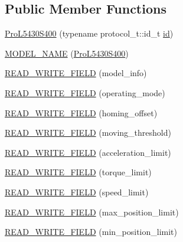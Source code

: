 \subsection*{Public Member Functions}
\begin{DoxyCompactItemize}
\item 
\hyperlink{classdynamixel_1_1servos_1_1_pro_l5430_s400_af4b0f26432d0cff1da96587695f6f37b}{Pro\+L5430\+S400} (typename protocol\+\_\+t\+::id\+\_\+t \hyperlink{classdynamixel_1_1servos_1_1_servo_a2d022081672e25a7bb57b76706e1cc57}{id})
\item 
\hyperlink{classdynamixel_1_1servos_1_1_pro_l5430_s400_ad33f5bc07548ce765acddfe12567bfa4}{M\+O\+D\+E\+L\+\_\+\+N\+A\+ME} (\hyperlink{classdynamixel_1_1servos_1_1_pro_l5430_s400}{Pro\+L5430\+S400})
\item 
\hyperlink{classdynamixel_1_1servos_1_1_pro_l5430_s400_a548d8b215279c3f45d637e178388aa8a}{R\+E\+A\+D\+\_\+\+W\+R\+I\+T\+E\+\_\+\+F\+I\+E\+LD} (model\+\_\+info)
\item 
\hyperlink{classdynamixel_1_1servos_1_1_pro_l5430_s400_a43c7426506ee4c5953f2beebd71f8877}{R\+E\+A\+D\+\_\+\+W\+R\+I\+T\+E\+\_\+\+F\+I\+E\+LD} (operating\+\_\+mode)
\item 
\hyperlink{classdynamixel_1_1servos_1_1_pro_l5430_s400_a37dcd01bb0fb5f5f68c100892dc86751}{R\+E\+A\+D\+\_\+\+W\+R\+I\+T\+E\+\_\+\+F\+I\+E\+LD} (homing\+\_\+offset)
\item 
\hyperlink{classdynamixel_1_1servos_1_1_pro_l5430_s400_a4ac72ffe983f53ee57a4778686932566}{R\+E\+A\+D\+\_\+\+W\+R\+I\+T\+E\+\_\+\+F\+I\+E\+LD} (moving\+\_\+threshold)
\item 
\hyperlink{classdynamixel_1_1servos_1_1_pro_l5430_s400_a7efa895b5f29f0943ab8cec53aebe992}{R\+E\+A\+D\+\_\+\+W\+R\+I\+T\+E\+\_\+\+F\+I\+E\+LD} (acceleration\+\_\+limit)
\item 
\hyperlink{classdynamixel_1_1servos_1_1_pro_l5430_s400_a41c945d33bb564026ef5471b783863f6}{R\+E\+A\+D\+\_\+\+W\+R\+I\+T\+E\+\_\+\+F\+I\+E\+LD} (torque\+\_\+limit)
\item 
\hyperlink{classdynamixel_1_1servos_1_1_pro_l5430_s400_ab057769ab4bba3d2c6ed8643e6bcd2ef}{R\+E\+A\+D\+\_\+\+W\+R\+I\+T\+E\+\_\+\+F\+I\+E\+LD} (speed\+\_\+limit)
\item 
\hyperlink{classdynamixel_1_1servos_1_1_pro_l5430_s400_a00408bf0f23a06b6a27e878aa99bf361}{R\+E\+A\+D\+\_\+\+W\+R\+I\+T\+E\+\_\+\+F\+I\+E\+LD} (max\+\_\+position\+\_\+limit)
\item 
\hyperlink{classdynamixel_1_1servos_1_1_pro_l5430_s400_ac867075df246bf7812210f03a0da5681}{R\+E\+A\+D\+\_\+\+W\+R\+I\+T\+E\+\_\+\+F\+I\+E\+LD} (min\+\_\+position\+\_\+limit)

\end{DoxyCompactItemize}
